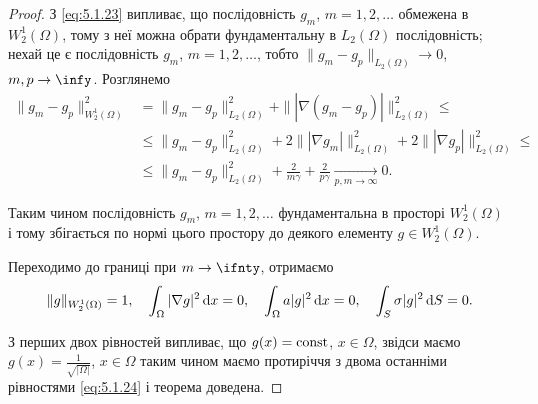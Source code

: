 \begin{proof}
    З \eqref{eq:5.1.23} випливає, що послідовність $g_m$, $m = 1, 2, \ldots$ обмежена в $W_2^1(\Omega)$, тому з неї можна обрати фундаментальну в $L_2(\Omega)$ послідовність; нехай це є послідовність $g_m$, $m = 1, 2, \ldots$, тобто $\|g_m - g_p\|_{L_2(\Omega)} \to 0$, $m, p \to \infy$. Розглянемо
    \begin{align*}
        \|g_m - g_p\|_{W_2^1(\Omega)}^2
        &= \|g_m - g_p\|_{L_2(\Omega)}^2 + \| |\nabla (g_m - g_p)| \|_{L_2(\Omega)}^2 \le \\
        &\le \|g_m - g_p\|_{L_2(\Omega)}^2 + 2 \| |\nabla g_m| \|_{L_2(\Omega)}^2 + 2 \| |\nabla g_p| \|_{L_2(\Omega)}^2 \le \\
        &\le \|g_m - g_p\|_{L_2(\Omega)}^2 + \frac{2}{m \gamma} + \frac{2}{p \gamma} \xrightarrow[p, m \to \infty]{} 0.
    \end{align*}

    Таким чином послідовність $g_m$, $m = 1, 2, \ldots$ фундаментальна в просторі $W_2^1(\Omega)$ і тому збігається по нормі цього простору до деякого елементу $g \in W_2^1(\Omega)$. \medskip 

    Переходимо до границі при $m \to \ifnty$, отримаємо
    \begin{equation}
        \label{eq:5.1.24}
        \|g\|_{W_2^1(\Omega)} = 1, \quad \int_\Omega |\nabla g|^2 \mathop{}\!\mathrm{d} x = 0, \quad \int_\Omega a |g|^2 \mathop{}\!\mathrm{d} x = 0, \quad \int_S \sigma |g|^2 \mathop{}\!\mathrm{d} S = 0.
    \end{equation}

    З перших двох рівностей випливає, що $g(x) = \operatorname{const}$, $x \in \Omega$, звідси маємо $g(x) = \frac{1}{\sqrt{|\Omega|}}$, $x \in \Omega$ таким чином маємо протиріччя з двома останніми рівностями \eqref{eq:5.1.24} і теорема доведена.
\end{proof}


